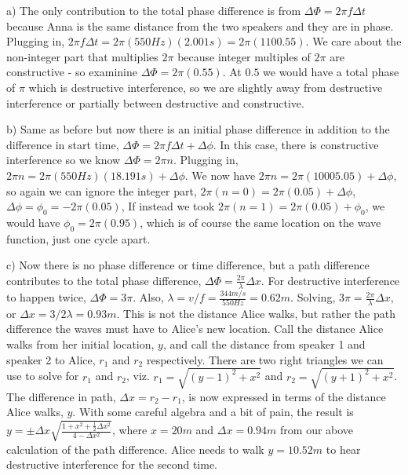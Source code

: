 \documentclass[10pt]{article}
\newenvironment{problem}[2][Problem]{\begin{trivlist}
\item[\hskip \labelsep {\bfseries #1}\hskip \labelsep {\bfseries #2.}]}{\end{trivlist}}
\begin{document}
\begin{problem}{3}
\item a) The only contribution to the total phase difference is from $\Delta \Phi = 2\pi f\Delta t$ because Anna is the same distance from the two speakers and they are in phase. Plugging in, $2\pi f \Delta t=2\pi (550Hz) (2.001s) = 2\pi(1100.55)$. We care about the non-integer part that multiplies $2\pi$ because integer multiples of $2\pi$ are constructive - so examinine $\Delta \Phi = 2\pi(0.55)$. At $0.5$ we would have a total phase of $\pi$ which is destructive interference, so we are slightly away from destructive interference or partially between destructive and constructive.
\item b) Same as before but now there is an initial phase difference in addition to the difference in start time, $\Delta \Phi = 2\pi f \Delta t + \Delta \phi$. In this case, there is constructive interference so we know $\Delta \Phi = 2\pi n$. Plugging in, $ 2\pi n = 2\pi (550Hz)(18.191s) + \Delta \phi$. We now have $2\pi n = 2\pi (10005.05) + \Delta \phi$, so again we can ignore the integer part, $2\pi(n=0) = 2\pi (0.05) + \Delta \phi$, $\Delta \phi = \phi_0 = -2\pi (0.05)$, If instead we took $2\pi(n=1) = 2\pi(0.05) + \phi_0$, we would have $\phi_0 = 2\pi(0.95)$, which is of course the same location on the wave function, just one cycle apart.

\item c) Now there is no phase difference or time difference, but a path difference contributes to the total phase difference, $\Delta \Phi = \frac{2\pi}{\lambda}\Delta x$. For destructive interference to happen twice, $\Delta\Phi = 3\pi$. Also, $\lambda = v/f = \frac{344m/s}{550Hz}=0.62m$. Solving, $3\pi = \frac{2\pi}{\lambda} \Delta x$, or $\Delta x = 3/2\lambda=0.93m$. This is not the distance Alice walks, but rather the path difference the waves must have to Alice's new location. Call the distance Alice walks from her initial location, $y$, and call the distance from speaker 1 and speaker 2 to Alice, $r_1$ and $r_2$ respectively. There are two right triangles we can use to solve for $r_1$ and $r_2$, viz. $r_1 = \sqrt{(y-1)^2+x^2}$ and $r_2 = \sqrt{(y+1)^2+x^2}$. The difference in path, $\Delta x = r_2-r_1$, is now expressed in terms of the distance Alice walks, $y$. With some careful algebra and a bit of pain, the result is $y=\pm\Delta x \sqrt{\frac{1+x^2 + \frac{1}{2}\Delta x^2}{4-\Delta x^2}}$, where $x=20m$ and $\Delta x=0.94m$ from our above calculation of the path difference. Alice needs to walk $y=10.52m$ to hear destructive interference for the second time.


\end{problem}
\end{document}
